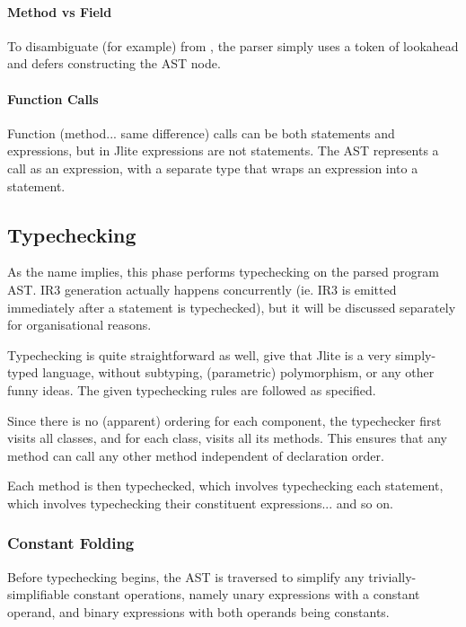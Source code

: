 \documentclass[12pt]{article}
\begin{document}
\paragraph{Method vs Field}

To disambiguate (for example)  from , the parser simply uses a token of lookahead
and defers constructing the AST node.

\paragraph{Function Calls}

Function (method... same difference) calls can be both statements and expressions, but in Jlite expressions are
not statements. The AST represents a call as an expression, with a separate  type that wraps an
expression into a statement.



\subsection{Typechecking}

As the name implies, this phase performs typechecking on the parsed program AST. IR3 generation actually happens
concurrently (ie. IR3 is emitted immediately after a statement is typechecked), but it will be discussed separately
for organisational reasons.

Typechecking is quite straightforward as well, give that Jlite is a very simply-typed language, without subtyping,
(parametric) polymorphism, or any other funny ideas. The given typechecking rules are followed as specified.

Since there is no (apparent) ordering for each component, the typechecker first visits all classes, and for each class,
visits all its methods. This ensures that any method can call any other method independent of declaration order.

Each method is then typechecked, which involves typechecking each statement, which involves typechecking their
constituent expressions... and so on.


\subsubsection{Constant Folding}

Before typechecking begins, the AST is traversed to simplify any trivially-simplifiable constant operations,
namely unary expressions with a constant operand, and binary expressions with both operands being constants.
\end{document}
